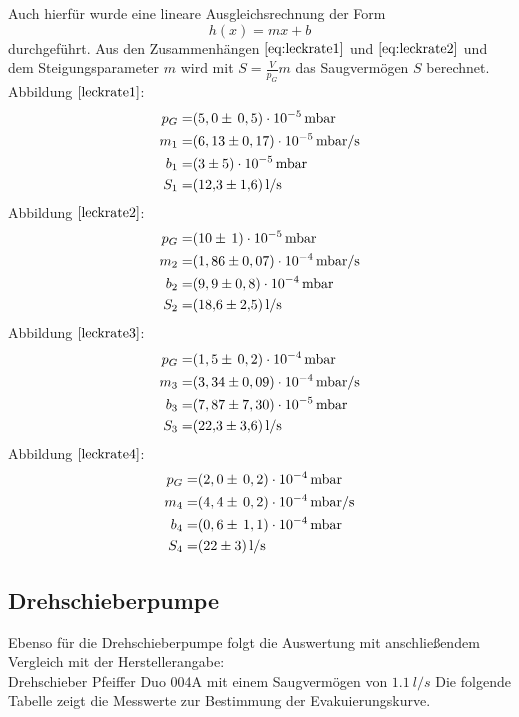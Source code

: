 Auch hierfür wurde eine lineare Ausgleichsrechnung der Form
\begin{equation}
	h(x)=mx+b
\end{equation}
durchgeführt.
Aus den Zusammenhängen $\ref{eq:leckrate1}$ und $\ref{eq:leckrate2}$ und dem Steigungsparameter $m$ wird mit $S=\frac{V}{p_G}m$
das Saugvermögen $S$ berechnet.\\

Abbildung $\ref{leckrate1}$:
	\begin{align*}
		p_G=& (5,0 \pm \, 0,5)\cdot 10^{-5} \, \si{mbar}\\
		m_1=& (6,13 \pm 0,17)\cdot 10^{-5} \, \si{mbar/s}\\
		b_1=& (3 \pm 5)\cdot 10^{-5} \, \si{mbar}\\
		S_1=& \SI{12,3 \pm 1,6}{l/s}
	\end{align*}
	Abbildung $\ref{leckrate2}$:
		\begin{align*}
			p_G=& (10 \pm \, 1)\cdot 10^{-5} \, \si{mbar}\\
			m_2=& (1,86 \pm 0,07)\cdot 10^{-4} \, \si{mbar/s}\\
			b_2=& (9,9 \pm 0,8)\cdot 10^{-4} \, \si{mbar}\\
			S_2=& \SI{18,6 \pm 2,5}{l/s}
		\end{align*}
		Abbildung $\ref{leckrate3}$:
			\begin{align*}
				p_G=& (1,5 \pm \, 0,2)\cdot 10^{-4} \, \si{mbar}\\
				m_3=& (3,34 \pm 0,09)\cdot 10^{-4} \, \si{mbar/s}\\
				b_3=& (7,87 \pm 7,30)\cdot 10^{-5} \, \si{mbar}\\
				S_3=& \SI{22,3 \pm 3,6}{l/s}
			\end{align*}
		Abbildung $\ref{leckrate4}$:
			\begin{align*}
				p_G=& (2,0 \pm \, 0,2)\cdot 10^{-4} \, \si{mbar}\\
				m_4=& (4,4 \pm \, 0,2)\cdot 10^{-4} \, \si{mbar/s}\\
				b_4=& (0,6 \pm \, 1,1)\cdot 10^{-4} \, \si{mbar}\\
				S_4=& \SI{22 \pm 3}{l/s}
			\end{align*}

\subsection{Drehschieberpumpe}
Ebenso für die Drehschieberpumpe folgt die Auswertung mit anschließendem Vergleich mit der
Herstellerangabe\cite{anleitung}:\\
Drehschieber Pfeiffer Duo 004A mit einem Saugvermögen von $\SI{1,1}{l/s}$\newpage
Die folgende Tabelle zeigt die Messwerte zur Bestimmung der Evakuierungskurve.
